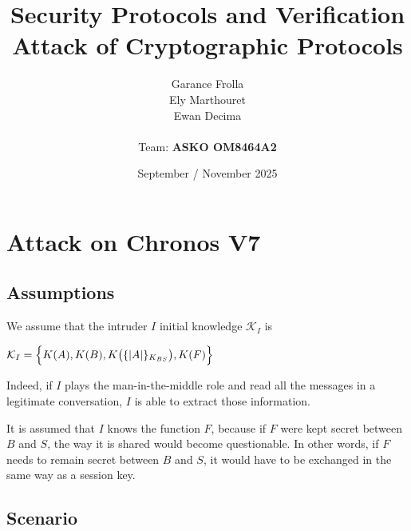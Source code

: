 \documentclass[11pt]{article}
\begin{document}
    \title{
            { \textbf{Security Protocols and Verification}} \\[1ex]
        {\small Attack of Cryptographic Protocols}
    }


    \author{
        Garance Frolla \\
        Ely Marthouret \\
        Ewan Decima\\ \\
        Team: \textbf{ASKO OM8464A2}
    }

    \date{September / November 2025}


    \maketitle
    \tableofcontents
    \newpage



    \section{Attack on Chronos V7}
    \subsection{Assumptions}
    We assume that the intruder $I$ initial knowledge $\mathcal{K}_I$ is
    \begin{center}
        $\mathcal{K}_I = \Bigl\{ K(A), K(B), K\bigl(\{|A|\}_{K_{BS}}\bigr), K(F) \Bigr\}$
    \end{center}

    Indeed, if $I$ plays the man-in-the-middle role and read all the messages in a legitimate conversation, $I$ is able to
    extract those information.

It is assumed that $I$ knows the function $F$, because if $F$ were kept secret between $B$ and $S$, the way it is shared would become questionable.
    In other words, if $F$ needs to remain secret between $B$ and $S$, it would have to be exchanged in the same way as a session key.





    \subsection{Scenario}
    
\end{document}
